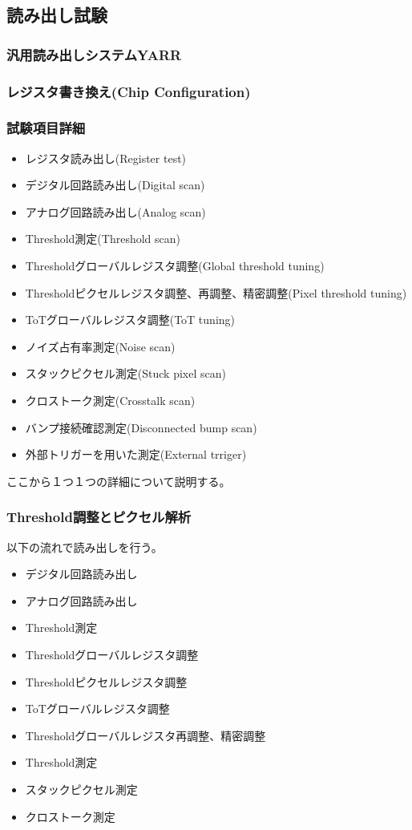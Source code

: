 \clearpage
\subsection{読み出し試験}

\subsubsection{汎用読み出しシステムYARR}

\subsubsection{レジスタ書き換え(Chip Configuration)}

\subsubsection{試験項目詳細}
\begin{itemize}
  \item レジスタ読み出し(Register test)
  \item デジタル回路読み出し(Digital scan)
  \item アナログ回路読み出し(Analog scan)
  \item Threshold測定(Threshold scan)
  \item Thresholdグローバルレジスタ調整(Global threshold tuning)
  \item Thresholdピクセルレジスタ調整、再調整、精密調整(Pixel threshold tuning)
  \item ToTグローバルレジスタ調整(ToT tuning)
  \item ノイズ占有率測定(Noise scan)
  \item スタックピクセル測定(Stuck pixel scan)
  \item クロストーク測定(Crosstalk scan)
  \item バンプ接続確認測定(Disconnected bump scan)
  \item 外部トリガーを用いた測定(External trriger)
\end{itemize}
ここから１つ１つの詳細について説明する。
  
\subsubsection{Threshold調整とピクセル解析}\label{sec:pixel_analysis}
以下の流れで読み出しを行う。
\begin{itemize}
  \item デジタル回路読み出し
  \item アナログ回路読み出し
  \item Threshold測定
  \item Thresholdグローバルレジスタ調整
  \item Thresholdピクセルレジスタ調整
  \item ToTグローバルレジスタ調整
  \item Thresholdグローバルレジスタ再調整、精密調整
  \item Threshold測定
  \item スタックピクセル測定
  \item クロストーク測定
\end{itemize}

